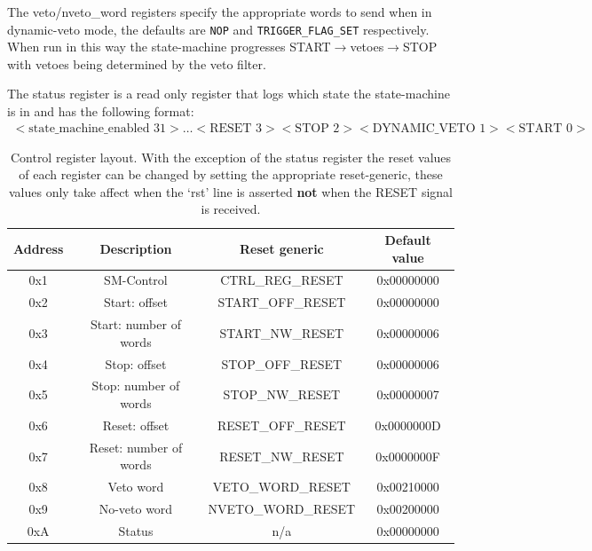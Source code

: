 \documentclass[]{report}
\begin{document}
    The veto/nveto\_word registers specify the appropriate words to send when in dynamic-veto mode, the defaults are \texttt{NOP} and \texttt{TRIGGER\_FLAG\_SET} respectively. When run in this way the state-machine progresses START\(\rightarrow\)vetoes\(\rightarrow\)STOP with vetoes being determined by the veto filter.
      
    The status register is a read only register that logs which state the state-machine is in and has the following format:
    \begin{align} \label{fmt:status_reg}
        <\text{state\_machine\_enabled } 31>\ldots<\text{RESET } 3> <\text{STOP } 2> <\text{DYNAMIC\_VETO } 1> <\text{START } 0>
    \end{align}
	  
    \begin{table}
        \begin{center}
            \begin{tabular}{c|c | c |c}
                Address & Description             & Reset generic      & Default value  \\
                \hline                    
                0x1     & SM-Control              & CTRL\_REG\_RESET   & 0x00000000     \\ 
                0x2     & Start: offset           & START\_OFF\_RESET  & 0x00000000     \\  
                0x3     & Start: number of words  & START\_NW\_RESET   & 0x00000006     \\ 
                0x4     & Stop: offset            & STOP\_OFF\_RESET   & 0x00000006     \\ 
                0x5     & Stop: number of words   & STOP\_NW\_RESET    & 0x00000007     \\ 
                0x6     & Reset: offset           & RESET\_OFF\_RESET  & 0x0000000D     \\ 
                0x7     & Reset: number of words  & RESET\_NW\_RESET   & 0x0000000F     \\ 
                0x8     & Veto word               & VETO\_WORD\_RESET  & 0x00210000     \\ 
                0x9     & No-veto word            & NVETO\_WORD\_RESET & 0x00200000     \\ 
                0xA     & Status                  & n/a                & 0x00000000     \\ 
            \end{tabular}
        \end{center}
        \caption{Control register layout. With the exception of the status register the reset values of each register can be changed by setting the appropriate reset-generic, these values only take affect when the `rst' line is asserted \textbf{not} when the RESET signal is received.}
        \label{tab:ctrl_reg_default}
    \end{table}
\end{document}
